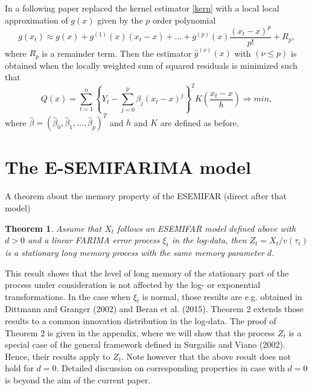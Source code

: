 \documentclass[12pt]{article}
\newtheorem{theorem}{Theorem}
\begin{document}
In a following paper \citet{beran2002local} replaced the kernel estimator \eqref{kern} with a local 
local approximation of \(g(x)\) given by the \(p\) order polynomial
\begin{equation}
\label{lp}
g(x_{t}) \approx g(x) + g^{(1)}(x)(x_{t} - x) + \ldots + g^{(p)}(x)\frac{(x_{t} - x)^{p}}{p!} + R_{p},
\end{equation}
where \(R_{p}\) is a remainder term. Then the estimator \(\hat{g}^{(\nu)}(x)\) with \((\nu \leq p)\) is obtained when the locally weighted sum of squared residuals is minimized such that
\begin{equation}
\label{eq:2.2}
Q(x) = \sum_{t=1}^{n} \left\lbrace Y_{t} - \sum_{j=0}^{p} \beta_{j}(x_{t} - x)^{j} \right\rbrace^{2} K \left( \frac{x_{t} - x}{h} \right) \Rightarrow min ,
\end{equation}
where \(\hat{\beta} = (\hat{\beta}_{0},\hat{\beta}_{1},\ldots,\hat{\beta}_{p})^{T}\) and $h$ and $K$ are defined as before. 



\section{The E-SEMIFARIMA model}




A theorem about the memory property of the ESEMIFAR (direct after that model) 
\begin{theorem}
Assume that $X_t$ follows an ESEMIFAR model defined above with $d>0$ and a linear FARIMA error process $\xi_t$ in the log-data, then $Z_t=X_t/v(\tau_t)$ is a stationary long memory process with the same memory parameter $d$.   
\end{theorem}
This result shows that the level of long memory of the stationary part of the process under consideration is not affected by the log- or exponential transformations. In the case when $\xi_t$ is normal, those results are e.g. obtained in Dittmann and Granger (2002) and Beran et al. (2015). Theorem 2 extends those results to a common innovation distribution in the log-data. The proof of Theorem 2 is given in the appendix, where we will show that the process $Z_t$ is a special case of the general framework defined in Surgailis and Viano (2002). Hence, their results apply to $Z_t$. Note however that the above result does not hold for $d=0$. Detailed discussion on corresponding properties in case with $d=0$ is beyond the aim of the current paper.  
\end{document}
